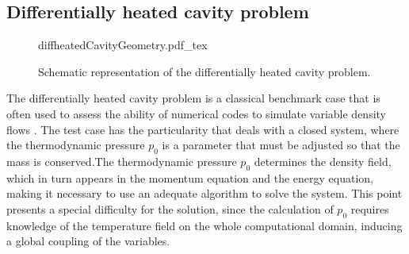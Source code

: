 \subsection{Differentially heated cavity problem}\label{ss:DHC}
\begin{figure}[bt]
	\begin{center}
		\def\svgwidth{0.53\textwidth}
		{diffheatedCavityGeometry.pdf_tex}
		\caption{Schematic representation of the differentially heated cavity problem.}
		\label{DHCGeom}
	\end{center}
\end{figure}
The differentially heated cavity problem is a classical benchmark case that is often used to assess the ability of numerical codes to simulate variable density flows \citep{paillereComparisonLowMach2000,vierendeelsBenchmarkSolutionsNatural2003,tyliszczakProjectionMethodHighorder2014}.
The test case has the particularity that deals with a closed system, where the thermodynamic pressure $p_0$ is a parameter that must be adjusted so that the mass is conserved.The thermodynamic pressure $p_0$ determines the density field, which in turn appears in the momentum equation and the energy equation, making it necessary to use an adequate algorithm to solve the system. This point presents a special difficulty for the solution, since the calculation of $p_0$ requires knowledge of the temperature field on the whole computational domain, inducing a global coupling of the variables. 

